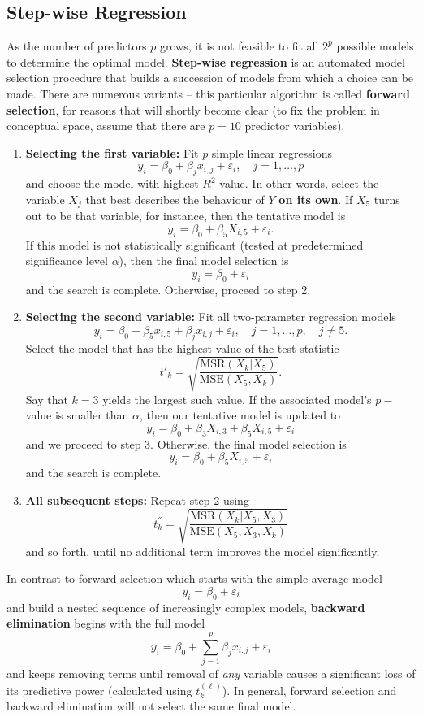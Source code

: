 \subsection{Step-wise Regression}
As the number of predictors $p$ grows, it is not feasible to fit all $2^{p}$ possible models to determine the optimal model. \textbf{Step-wise regression} is an automated model selection procedure that builds a succession of models from which a choice can be made. There are numerous variants -- this particular algorithm is called \textbf{forward selection}, for reasons that will shortly become clear (to fix the problem in conceptual space, assume that there are $p=10$ predictor variables).
\begin{enumerate}
    \item \textbf{Selecting the first variable:} Fit $p$ simple linear regressions $$y_i=\beta_0 + \beta_jx_{i,j}+\varepsilon_i,\quad j=1,\ldots, p$$ and choose the model with highest $R^{2}$ value. In other words, select the variable $X_j$ that best describes the behaviour of $Y$ \textbf{on its own}. If $X_{5}$ turns out to be that variable, for instance, then the tentative model is $$y_{i}=\beta_{0}+\beta_{5}X_{i,5}+\varepsilon_{i}.$$ If this model is not statistically significant (tested at predetermined significance level $\alpha$), then the final model selection is $$y_{i}=\beta_{0}+\varepsilon_{i}$$ and the search is complete. Otherwise, proceed to step 2.
    \item \textbf{Selecting the second variable:} Fit all two-parameter regression models $$y_i=\beta_0 + \beta_5x_{i,5}+ \beta_jx_{i,j}+\varepsilon_i,\quad j=1,\ldots, p,\quad j\neq 5.$$ Select the model that has the highest value of the test statistic $$t{'}_{k}=\sqrt{\frac{\textrm{MSR}(X_{k}|X_{5})}{\textrm{MSE}(X_{5}, X_{k})}}.$$ Say that $k=3$ yields the largest such value. If the associated model's $p-$value is smaller than $\alpha$, then our tentative model is updated to $$y_{i}=\beta_{0}+\beta_{3}X_{i,3}+\beta_{5}X_{i,5}+\varepsilon_{i}$$ and we proceed to step 3. Otherwise, the final model selection is $$y_{i}=\beta_{0}+\beta_{5}X_{i,5}+\varepsilon_{i}$$ and the search is complete.  
    \item \textbf{All subsequent steps:} Repeat step 2 using $$t^{''}_k=\sqrt{\frac{\textrm{MSR}(X_{k}|X_{5},X_3)}{\textrm{MSE}(X_{5}, X_3,X_{k})}}$$ and so forth, until no additional term improves the model significantly.
\end{enumerate}
In contrast to forward selection which starts with the simple average model $$y_{i}=\beta_{0}+\varepsilon_{i}$$ and build a nested sequence of increasingly complex models, \textbf{backward elimination} begins with the full model $${y}_{i}=\beta_{0}+\sum_{j=1}^{p}\beta_{j}x_{i,j}+\varepsilon_{i}$$ and keeps removing terms until removal of \textit{any} variable causes a significant loss of its predictive power (calculated using $t^{(\ell)}_{k}$). In general, forward selection and backward elimination will not select the same final model. 
